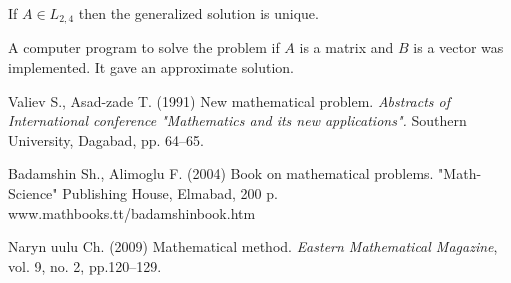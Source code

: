 \documentclass[12pt,a4paper,reqno]{amsart}
\begin{document}

\begin{Hypothesis} If $A \in L_{2,4}$ then the generalized solution is unique.
\end{Hypothesis}

A computer program to solve the problem if $A$ is a matrix and $B$
is a vector was implemented. It gave an approximate solution.


\begin{thebibliography}{2}

\bibitem{} Valiev S., Asad-zade T. (1991) New mathematical problem.
{\it {Abstracts of International conference "Mathematics and its new
applications".}} Southern University, Dagabad, pp. 64--65.

\bibitem{} Badamshin Sh., Alimoglu F. (2004) Book on mathematical problems. "Math-Science" Publishing House, Elmabad, 200 p.
\\www.mathbooks.tt/badamshinbook.htm

\bibitem{} Naryn uulu Ch. (2009) Mathematical method. {\it { Eastern Mathematical Magazine}}, vol. 9, no. 2,
pp.120--129.

\end{thebibliography}
\end{document}

